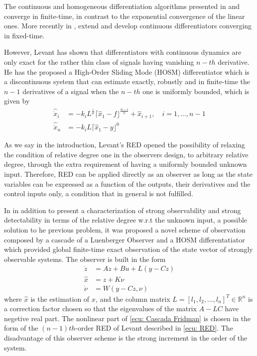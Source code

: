 \documentclass[11pt,letterpaper,twoside,openright]{report}
\newcommand{\sig}[2]{\lceil#1\rfloor^{#2}}
\begin{document}
The continuous and homogeneous differentiation algorithms presented in \cite{Perruquetti2008} and \cite{Andrieu2008} converge in finite-time, in contrast to the exponential convergence of the linear ones. More recently in ,\cite{Basin2017} \cite{Lopez2018} extend \cite{Perruquetti2008} and develop continuous differentiators converging in fixed-time. 

However, Levant \cite{Levant1998} has shown that differentiators with continuous dynamics are only exact for the rather thin class of signals having vanishing $n-th$ derivative. He has the proposed a High-Order Sliding Mode (HOSM) differentiator which is a discontinuous system that can estimate exactly, robustly and in finite-time the $n-1$ derivatives of a signal when the $n-th$ one is uniformly bounded, which is given by
\begin{equation}\label{ecu: RED}
\begin{split}
\hat{\dot{x}}_i &= -k_i L^{\frac{i}{n}} \sig{ \hat{x}_1-f }{\frac{n-i}{n}} + \hat{x}_{i+1},\quad i=1,...,n-1 \\
\hat{\dot{x}}_n &= -k_i L \sig{ \hat{x}_1-y }{0}
\end{split}
\end{equation}

As we say in the introduction, Levant's RED opened the possibility of relaxing the condition of relative degree one in the observers design, to arbitrary relative degree, through the extra requirement of having a uniformly bounded unknown input. Therefore, RED can be applied directly as an observer as long as the state variables can be expressed as a function of the outputs, their derivatives and the control inputs only, a condition that in general is not fulfilled.

In \cite{Fridman2006}\cite{Fridman2007}\cite{Fridman2008} in addition to present a characterization of strong observability and strong detectability in terms of the relative degree w.r.t the unknown input, a possible solution to he previous problem, it was proposed a novel scheme of observation composed by a cascade of a Luenberger Observer and a HOSM differentatiator which provided global finite-time exact observation of the state vector of strongly observable systems. The observer is built in the form
\begin{equation}\label{ecu: Cascada Fridman}
\begin{split}
\dot{z} &= Az+Bu+L(y-Cz)\\
\hat{x} &= z +K\nu \\
\dot{\nu} &= W(y-Cz,\nu)
\end{split}
\end{equation}
where $\hat{x}$ is the estimation of $x$, and the column matrix $L=[l_1,l_2,...,l_n]^T\in \mathbb{R}^n$ is a correction factor chosen so that the eigenvalues of the matrix $A-LC$ have negetive real part. The nonlinear part of \eqref{ecu: Cascada Fridman} is chosen in the form of the $(n-1)th$-order RED of Levant \cite{Levant1998} described in \eqref{ecu: RED}. The disadvantage of this observer scheme is the strong increment in the order of the system.
\end{document}
